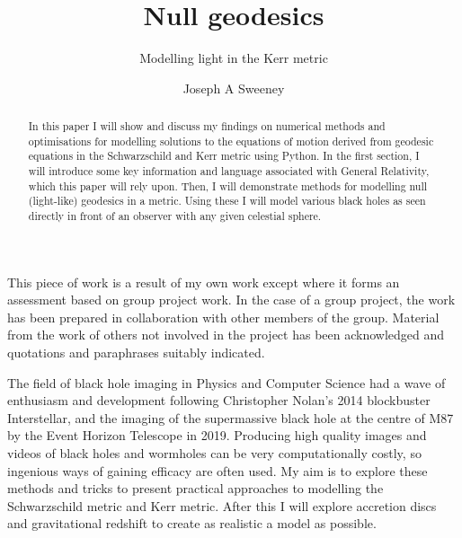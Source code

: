\documentclass[oneside,openright,frontopenright, singlespacing]{dmathesis}
\begin{document}
\title{Null geodesics}
\subtitle{Modelling light in the Kerr metric}
\author{Joseph A Sweeney}
\maketitlepage*

\begin{abstract}
%
	In this paper I will show and discuss my findings on numerical methods and optimisations for modelling solutions to the equations of motion derived from geodesic equations in the Schwarzschild and Kerr metric using Python. In the first section, I will introduce some key information and language associated with General Relativity, which this paper will rely upon. Then, I will demonstrate methods for modelling null (light-like) geodesics in a metric. Using these I will model various black holes as seen directly in front of an observer with any given celestial sphere.
%
\end{abstract}

\begin{declaration*}
%
	This piece of work is a result of my own work except where it forms an assessment based on group project work. In the case of a group project, the work has been prepared in collaboration with other members of the group. Material from the work of others not involved in the project has been acknowledged and quotations and paraphrases suitably indicated.
%
\end{declaration*}

\disableprotrusion
\tableofcontents*
\enableprotrusion

\cleardoublepage
{}

%
%
%
%
\begin{introduction}

	The field of black hole imaging in Physics and Computer Science had a wave of enthusiasm 
	and development following Christopher Nolan’s 2014 blockbuster Interstellar\cite{Interstellar}, and the imaging of the supermassive 
	black hole at the centre of M87 by the Event Horizon Telescope in 2019\cite{event2019first}. Producing high quality images 
	and videos of black holes and wormholes can be very computationally costly, so ingenious ways of gaining 
	efficacy are often used. My aim is to explore these methods and tricks to present practical approaches 
	to modelling the Schwarzschild metric and Kerr metric. After this I will explore accretion discs and gravitational redshift to create as realistic a model as possible.

\end{introduction}
\end{document}
